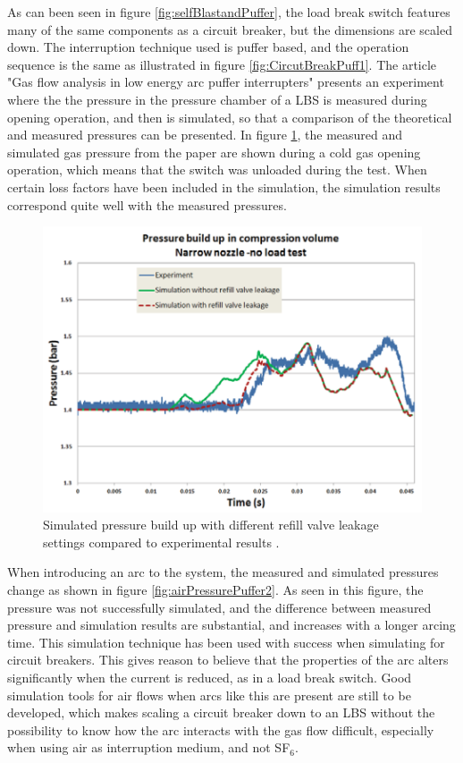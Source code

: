 \documentclass[10pt,b5paper,twoside]{article}
\begin{document}
As can been seen in figure \ref{fig:selfBlastandPuffer}, the load break switch features many of the same components as a circuit breaker, but the dimensions are scaled down. The interruption technique used is puffer based, and the operation sequence is the same as illustrated in figure \ref{fig:CircutBreakPuff1}. The article "Gas flow analysis in low energy arc puffer interrupters" \cite{bib:CBAC} presents an experiment where the the pressure in the pressure chamber of a LBS is measured during opening operation, and then is simulated, so that a comparison of the theoretical and measured pressures can be presented. In figure \ref{fig:airPressurePuffer}, the measured and simulated gas pressure from the paper are shown during a cold gas opening operation, which means that the switch was unloaded during the test. When certain loss factors have been included in the simulation, the simulation results correspond quite well with the measured pressures.


\begin{figure} [H]
\centering
\includegraphics[scale=0.65]{Bilder/Theory/tankPressure.png}
\caption{Simulated pressure build up with different refill valve leakage settings compared to experimental results  \cite{bib:CBAC}.} \label{fig:airPressurePuffer}
\end{figure}

When introducing an arc to the system, the measured and simulated pressures change as shown in figure \ref{fig:airPressurePuffer2}. As seen in this figure, the pressure was not successfully simulated, and the difference between measured pressure and simulation results are substantial, and increases with a longer arcing time. This simulation technique has been used with success when simulating for circuit breakers. This gives reason to believe that the properties of the arc alters significantly when the current is reduced, as in a load break switch. Good simulation tools for air flows when arcs like this are present are still to be developed, which makes scaling a circuit breaker down to an LBS without the possibility to know how the arc interacts with the gas flow difficult, especially when using air as interruption medium, and not SF$_6$.
\end{document}

